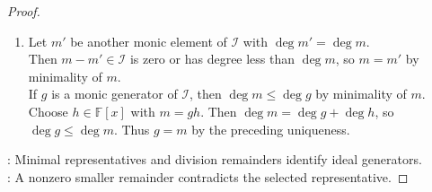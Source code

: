 \begin{theorem}
\begin{proof}
\begin{enumerate}[label=(\roman*)]
Since $r=p-qm\in\mathcal{I}$, a nonzero $r$ could be scaled to a monic element of smaller degree.\\
Hence $r=0$ by minimality of $m$, so $\mathcal{I}\subseteq\langle m\rangle$; the reverse inclusion holds by $m\in\mathcal{I}$.
\item Let $m'$ be another monic element of $\mathcal{I}$ with $\deg m'=\deg m$.\\
Then $m-m'\in\mathcal{I}$ is zero or has degree less than $\deg m$, so $m=m'$ by minimality of $m$.\\
If $g$ is a monic generator of $\mathcal{I}$, then $\deg m\leq\deg g$ by minimality of $m$.\\
Choose $h\in\mathbb{F}[x]$ with $m=gh$. Then $\deg m=\deg g+\deg h$, so $\deg g\leq\deg m$. Thus $g=m$ by the preceding uniqueness.
\end{enumerate}
: Minimal representatives and division remainders identify ideal generators.\\
: A nonzero smaller remainder contradicts the selected representative.
\end{proof}
\end{theorem}


